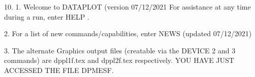 10.
1. Welcome to DATAPLOT (version 07/12/2021  For assistance at
   any time during a run, enter HELP   .

2. For a list of new commands/capabilities,
   enter NEWS  (updated 07/12/2021)

3. The alternate Graphics output files (creatable
   via the DEVICE 2 and 3 commands) are
   dppl1f.tex and dppl2f.tex respectively.
YOU HAVE JUST ACCESSED THE FILE DPMESF.
